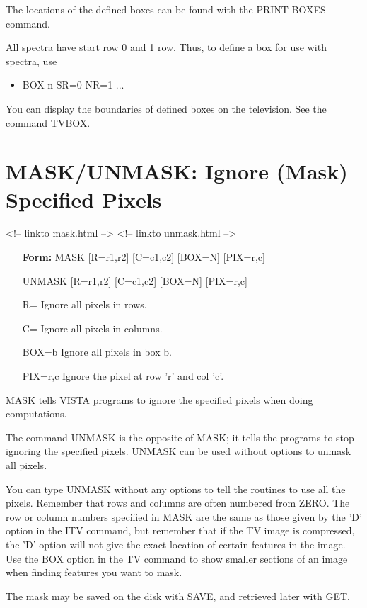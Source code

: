 The locations of the defined boxes can be found with the PRINT BOXES
command.

All spectra have start row 0 and 1 row.  Thus, to define a box for use with
spectra, use
\begin{itemize}
  \item{BOX n SR=0 NR=1 ...}
\end{itemize}

You can display the boundaries of defined boxes on the television. See the
command TVBOX.

\section{MASK/UNMASK: Ignore (Mask) Specified Pixels}
\begin{rawhtml}
<!-- linkto mask.html -->
<!-- linkto unmask.html -->
\end{rawhtml}
\begin{itemize}
  \item[\textbf{Form:} MASK {[R=r1,r2]} {[C=c1,c2]} {[BOX=N]} 
       {[PIX=r,c]}\hfill]{}
  \item[UNMASK  {[R=r1,r2]} {[C=c1,c2]} {[BOX=N]} {[PIX=r,c]}\hfill]{}
  \item[R=]{Ignore all pixels in rows.}
  \item[C=]{Ignore all pixels in columns.}
  \item[BOX=b]{Ignore all pixels in box b.}
  \item[PIX=r,c]{Ignore the pixel at row 'r' and col 'c'.}
\end{itemize}

MASK tells VISTA programs to ignore the specified pixels when doing
computations.

The command UNMASK is the opposite of MASK; it tells the programs to stop
ignoring the specified pixels.  UNMASK can be used without options to
unmask all pixels.

You can type UNMASK without any options to tell the routines to use all the
pixels.  Remember that rows and columns are often numbered from ZERO.  The
row or column numbers specified in MASK are the same as those given by the
'D' option in the ITV command, but remember that if the TV image is
compressed, the 'D' option will not give the exact location of certain
features in the image.  Use the BOX option in the TV command to show
smaller sections of an image when finding features you want to mask.

The mask may be saved on the disk with SAVE, and retrieved later with GET.

